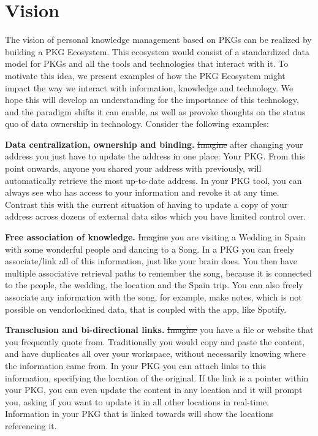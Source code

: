 \section{Vision}
The vision of personal knowledge management based on PKGs can be realized by building a PKG Ecosystem. This ecosystem would consist of a standardized data model for PKGs and all the tools and technologies that interact with it. To motivate this idea, we present examples of how the PKG Ecosystem might impact the way we interact with information, knowledge and technology. We hope this will develop an understanding for the importance of this technology, and the paradigm shifts it can enable, as well as provoke thoughts on the status quo of data ownership in technology. Consider the following examples:

\textbf{Data centralization, ownership and binding.} \sout{Imagine} after changing your address you just have to update the address in one place: Your PKG. From this point onwards, anyone you shared your address with previously, will automatically retrieve the most up-to-date address. In your PKG tool, you can always see who has access to your information and revoke it at any time. Contrast this with the current situation of having to update a copy of your address across dozens of external data silos which you have limited control over.

\textbf{Free association of knowledge.} \sout{Imagine} you are visiting a Wedding in Spain with some wonderful people and dancing to a Song. In a PKG you can freely associate/link all of this information, just like your brain does. You then have multiple associative retrieval paths to remember the song, because it is connected to the people, the wedding, the location and the Spain trip. You can also freely associate any information with the song, for example, make notes, which is not possible on \gls{vendorlockin}ed data, that is coupled with the app, like Spotify.

\textbf{Transclusion and bi-directional links.} \sout{Imagine} you have a file or website that you frequently quote from. Traditionally you would copy and paste the content, and have duplicates all over your workspace, without necessarily knowing where the information came from. In your PKG you can attach links to this information, specifying the location of the original. If the link is a pointer within your PKG, you can even update the content in any location and it will prompt you, asking if you want to update it in all other locations in real-time. Information in your PKG that is linked towards will show the locations referencing it.

